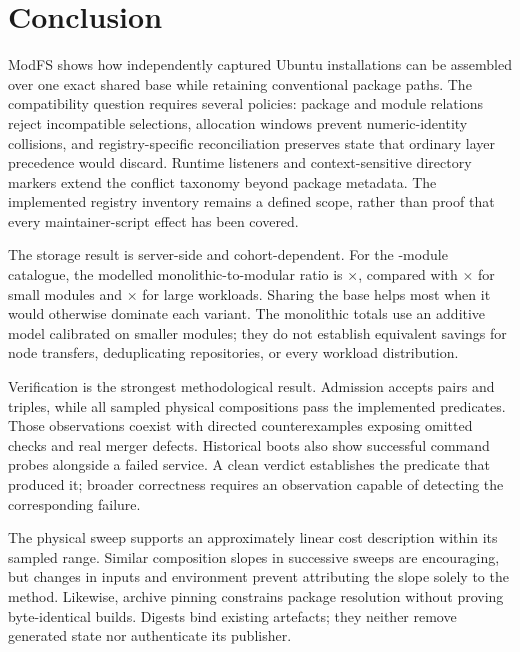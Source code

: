 \chapter{Conclusion}
\label{ch:conclusion}

ModFS shows how independently captured Ubuntu installations can be assembled over one exact shared base while retaining conventional package paths. The compatibility question requires several policies: package and module relations reject incompatible selections, allocation windows prevent numeric-identity collisions, and registry-specific reconciliation preserves state that ordinary layer precedence would discard. Runtime listeners and context-sensitive directory markers extend the conflict taxonomy beyond package metadata. The implemented registry inventory remains a defined scope, rather than proof that every maintainer-script effect has been covered.

The storage result is server-side and cohort-dependent. For the -module catalogue, the modelled monolithic-to-modular ratio is \(\times\), compared with \(\times\) for small modules and \(\times\) for large workloads. Sharing the base helps most when it would otherwise dominate each variant. The monolithic totals use an additive model calibrated on smaller modules; they do not establish equivalent savings for node transfers, deduplicating repositories, or every workload distribution.

Verification is the strongest methodological result. Admission accepts  pairs and  triples, while all  sampled physical compositions pass the implemented predicates. Those observations coexist with directed counterexamples exposing omitted checks and real merger defects. Historical boots also show successful command probes alongside a failed service. A clean verdict establishes the predicate that produced it; broader correctness requires an observation capable of detecting the corresponding failure.

The physical sweep supports an approximately linear cost description within its sampled range. Similar composition slopes in successive sweeps are encouraging, but changes in inputs and environment prevent attributing the slope solely to the method. Likewise, archive pinning constrains package resolution without proving byte-identical builds. Digests bind existing artefacts; they neither remove generated state nor authenticate its publisher.

